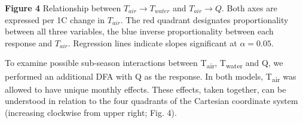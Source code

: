 \documentclass[notitlepage]{article}
\begin{document}
\begin{center}
\textbf{Figure 4} Relationship between $T_{air}\rightarrow T_{water}$ and $T_{air}\rightarrow Q$. Both axes are expressed per 1\degree C change in $T_{air}$. The red quadrant designates proportionality between all three variables, the blue inverse proportionality between each response and $T_{air}$. Regression lines indicate slopes significant at $\alpha=0.05$.
\end{center}

To examine possible sub-season interactions between T\textsubscript{air}, T\textsubscript{water} and Q, we performed an additional DFA with Q as the response. In both models, T\textsubscript{air} was allowed to have unique monthly effects. These effects, taken together, can be understood in relation to the four quadrants of the Cartesian coordinate system (increasing clockwise from upper right; Fig. 4).
\end{document}

